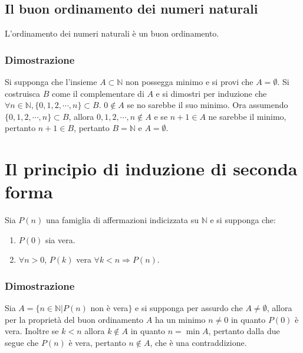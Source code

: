 \subsection{Il buon ordinamento dei numeri naturali}
L'ordinamento dei numeri naturali \`e un buon ordinamento.
\subsubsection{Dimostrazione}
Si supponga che l'insieme $A\subset\mathbb{N}$ non possegga minimo e si provi che $A=\emptyset$. Si costruisca $B$ come il complementare di $A$ e si dimostri per induzione che
$\forall n\in\mathbb{N}, \{0,1,2,\cdots, n\}\subset B$. $0\not\in A$ se no sarebbe il suo minimo. Ora assumendo $\{0,1,2,\cdots, n\}\subset B$, allora $0,1,2,\cdots, n\not\in A
$ e se $n+1\in A$ ne sarebbe il minimo, pertanto $n+1\in B$, pertanto $B=\mathbb{N}$ e $A=\emptyset$.
\section{Il principio di induzione di seconda forma}
Sia $P(n)$ una famiglia di affermazioni indicizzata su $\mathbb{N}$ e si supponga che:
\begin{enumerate}
\item $P(0)$ sia vera.
\item $\forall n>0$, $P(k)$ vera $\forall k<n\Rightarrow P(n)$.
\end{enumerate}
\subsubsection{Dimostrazione}
Sia $A=\{n\in\mathbb{N}|P(n)$ non \`e vera$\}$ e si supponga per assurdo che $A\neq\emptyset$, allora per la propriet\`a del buon ordinamento $A$ ha un minimo $n\neq 0$ in 
quanto $P(0)$ \`e vera. Inoltre se $k<n$ allora $k\not\in A$ in quanto $n=\min A$, pertanto dalla due segue che $P(n)$ \`e vera, pertanto $n\not\in A$, che \`e una 
contraddizione.
